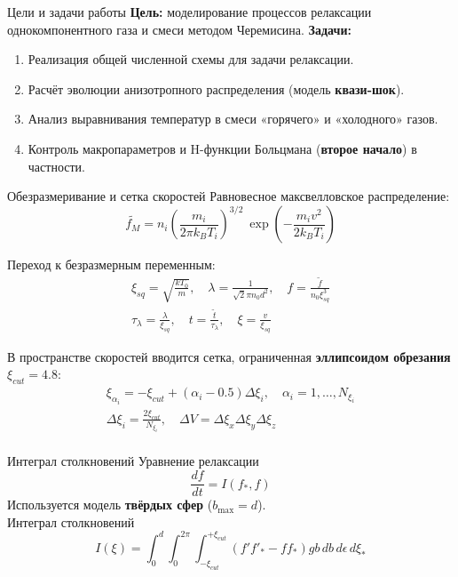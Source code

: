 \documentclass[aspectratio=169]{beamer}
\begin{document}
    \begin{frame}{Цели и задачи работы}
        \textbf{Цель:} моделирование процессов релаксации однокомпонентного газа и смеси методом Черемисина.
        \vfill
        \textbf{Задачи:}
        \begin{enumerate}
            \item Реализация общей численной схемы для задачи релаксации.
            \item Расчёт эволюции анизотропного распределения (модель \textbf{квази-шок}).
            \item Анализ выравнивания температур в смеси «горячего» и «холодного» газов.
            \item Контроль макропараметров и H-функции Больцмана (\textbf{второе начало}) в частности.
        \end{enumerate}
    \end{frame}
    
    \begin{frame}{Обезразмеривание и сетка скоростей}
        Равновесное максвелловское распределение:
        \[\tilde{f_M} = n_i \left(\frac{m_i}{2\pi k_B T_i} \right)^{3/2}~\exp \left(-\frac{m_i v^2}{2 k_B T_i}\right) \]
        
        Переход к безразмерным переменным:
        \begin{gather*}
            \xi_{sq} = \sqrt{\frac{k T_0}{m}}, \quad \lambda = \frac{1}{\sqrt{2}\pi n_0 d^2}, \quad f =
            \frac{\tilde{f}}{n_0 \xi_{sq}^3} \\
            \tau_\lambda = \frac{\lambda}{\xi_{sq}}, \quad t = \frac{\tilde{t}}{\tau_\lambda}, \quad \xi =
            \frac{v}{\xi_{sq}}
        \end{gather*}
        
        В пространстве скоростей вводится сетка, ограниченная \textbf{эллипсоидом обрезания} $\xi_{cut} = 4.8$:
        \begin{gather*}
            \xi_{\alpha_i} = -\xi_{cut} + (\alpha_i - 0.5)\Delta \xi_i, \quad \alpha_i = 1, \dots, N_{\xi_i} \\
            \Delta \xi_i = \frac{2\xi_{cut}}{N_{\xi_i}}, \quad \Delta V = \Delta \xi_x \Delta \xi_y \Delta \xi_z \\
        \end{gather*}
    \end{frame}

    \begin{frame}{Интеграл столкновений}
        Уравнение релаксации
        \[ \frac{df}{dt} = I(f_*, f) \]
        Используется модель \textbf{твёрдых сфер} ($b_{\max} = d$). \\
        Интеграл столкновений
        \[ I(\xi) = \int_0^d \int_0^{2 \pi} \int_{-\xi_{cut}}^{+\xi_{cut}} (f' f'_* - f f_*) g b \, db \, d\epsilon \, d\xi_* \]
    \end{frame}
\end{document}
